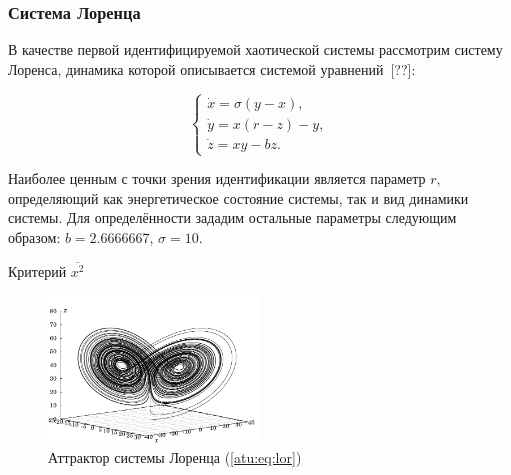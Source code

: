 
\FloatBarrier
\subsubsection{Система Лоренца} %


В качестве первой идентифицируемой хаотической системы рассмотрим
систему Лоренса, динамика которой описывается системой уравнений~[??]:

\begin{equation}
\begin{cases}
  \dot{x} = \sigma (y-x ) , \\
  \dot{y} = x (r-z) - y , \\
  \dot{z} = x y - b z .
\end{cases}
\label{atu:eq:lor}
\end{equation}

Наиболее ценным с точки зрения идентификации является параметр
$r$, определяющий как энергетическое состояние системы,
так и вид динамики системы.
Для определённости зададим остальные параметры следующим образом:
$b = 2.6666667$, $\sigma = 10$.

Критерий
$\overline{x^2}$


%


\begin{figure}[htb!]
\centerline{\includegraphics[width=0.5\textwidth]{p/cha/lor_phase3.pdf} }
\caption{Аттрактор системы Лоренца (\ref{atu:eq:lor})}
\label{atu:f:lor_phase}
\end{figure}



